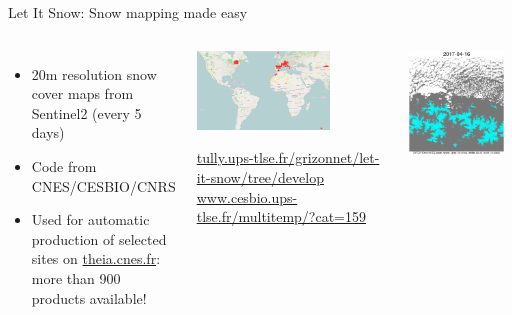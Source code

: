 \begin{frame}{Let It Snow: Snow mapping made easy}

  \begin{columns}
  \begin{itemize}
    \item 20m resolution snow cover maps from Sentinel2 (every 5 days)
    \item Code from CNES/CESBIO/CNRS
    \item Used for automatic production of selected sites on \url{theia.cnes.fr}: more than 900 products available!
  \end{itemize}
  \begin{center}
    \includegraphics[width=0.7\textwidth]{images/lis-map.png}\\
    \begin{tiny}
      \url{tully.ups-tlse.fr/grizonnet/let-it-snow/tree/develop}\\
      \url{www.cesbio.ups-tlse.fr/multitemp/?cat=159}
    \end{tiny}
  \end{center}
  \begin{center}
    \includegraphics[width=0.92\textwidth]{images/lis-example.png}\\

\end{center}
\end{columns}
\end{frame}
